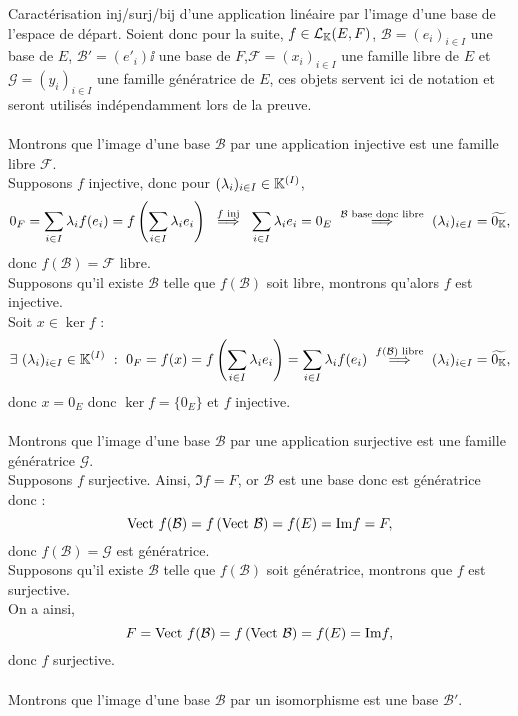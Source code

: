 \documentclass{article}
\begin{document}
\begin{question_kholle}
	{Caractérisation inj/surj/bij d'une application linéaire par l'image d'une base de l'espace de départ.}
	Soient donc pour la suite, $f \in \mathcal{L}_{\mathbb K}(E,F)$, $\mathcal{B} = (e_i)_{i\in I}$ une base de $E$, $\mathcal{B}' = (e'_i)\ii$ une base de $F$,$\mathcal{F} = (x_i)_{i\in I}$ une famille libre de $E$ et $\mathcal{G} = (y_i)_{i \in I}$ une famille génératrice de $E$, ces objets servent ici de notation et seront utilisés indépendamment lors de la preuve. \\ \\
	Montrons que l'image d'une base $\mathcal{B}$ par une application injective est une famille libre $\mathcal{F}$. \\
	Supposons $f$ injective, donc pour $(\lambda_i)_{i \in I} \in \mathbb K^{(I)}$,
	\[
		0_F = \sum_{i\in  I}\bda_i f(e_i) = f \left( \sum_{i\in  I} \bda_i e_i \right) \ \overset{f \text{ inj}}{\implies} \ \sum_{i\in  I} \bda_i e_i = 0_E \ \overset{\mathcal{B} \text{ base donc libre}}{\implies} \ (\bda _i)_{i\in  I} = \widetilde{0_\K},
	\]
	donc $f(\mathcal{B})= \mathcal{F}$ libre. \\
	Supposons qu'il existe $\mathcal{B}$ telle que $f(\mathcal{B})$ soit libre, montrons qu'alors $f$ est injective. \\
	Soit $x \in \ker f$ :
	\[
		\exists \ (\lambda_i)_{i \in I} \in \mathbb K^{(I)} \ : \ 0_F = f(x) = f\left( \sum_{i \in I} \lambda_i e_i \right) =\sum _{i \in I} \lambda _i f(e_i) \  \overset{f(\mathcal{B}) \text{ libre}}{\implies} \ (\lambda _i)_{i\in  I} = \widetilde{0_{\mathbb K}},
	\]
	donc $x = 0_E$ donc $\ker f = \{0_E\}$ et $f$ injective. \\ \\
	Montrons que l'image d'une base $\mathcal{B}$ par une application surjective est une famille génératrice $\mathcal{G}$. \\
	Supposons $f$ surjective. Ainsi, $\Im f = F$, or $\mathcal{B}$ est une base donc est génératrice donc :
	\[
		\text{Vect } f(\mathcal{B}) = f\left( \text{Vect } \mathcal{B} \right) = f( E) = \text{Im} f = F,
	\]
	donc $f(\mathcal{B}) = \mathcal{G}$ est génératrice. \\
	Supposons qu'il existe $\mathcal{B}$ telle que $f(\mathcal{B})$ soit génératrice, montrons que $f$ est surjective. \\
	On a ainsi,
	\[
		F = \text{Vect } f(\mathcal{B}) = f \left( \text{Vect } \mathcal{B} \right) = f(E) = \text{Im} f,
	\]
	donc $f$ surjective. \\ \\
	Montrons que l'image d'une base $\mathcal{B}$ par un isomorphisme est une base $\mathcal{B}'$. \\

\end{question_kholle}
\end{document}
